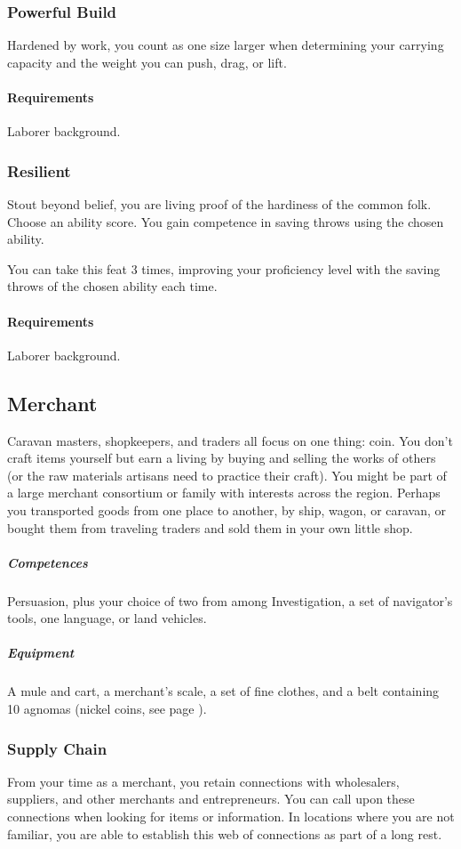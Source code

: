         \subsubsection{Powerful Build} \label{feat::powerfulbuild_bg}
            Hardened by work, you count as one size larger when determining your carrying capacity and the weight you can push, drag, or lift.
            \paragraph{Requirements} Laborer background.
        \subsubsection{Resilient} \label{feat::resilient}
            Stout beyond belief, you are living proof of the hardiness of the common folk.
            Choose an ability score.
            You gain competence in saving throws using the chosen ability.

            You can take this feat 3 times, improving your proficiency level with the saving throws of the chosen ability each time.
            \paragraph{Requirements} Laborer background.
\subsection*{Merchant} \label{ssec::merchant}
    Caravan masters, shopkeepers, and traders all focus on one thing: coin.
    You don't craft items yourself but earn a living by buying and selling the works of others (or the raw materials artisans need to practice their craft).
    You might be part of a large merchant consortium or family with interests across the region. Perhaps you transported goods from one place to another, by ship, wagon, or caravan, or bought them from traveling traders and sold them in your own little shop.

    \subparagraph{Competences} Persuasion, plus your choice of two from among Investigation, a set of navigator's tools, one language, or land vehicles.

    \subparagraph{Equipment} A mule and cart, a merchant's scale, a set of fine clothes, and a belt containing 10 agnomas (nickel coins, see page \pageref{sec::currency}).

    \subsubsection{Supply Chain} \label{feat::supplychain}
        From your time as a merchant, you retain connections with wholesalers, suppliers, and other merchants and entrepreneurs.
        You can call upon these connections when looking for items or information.
        In locations where you are not familiar, you are able to establish this web of connections as part of a long rest.

